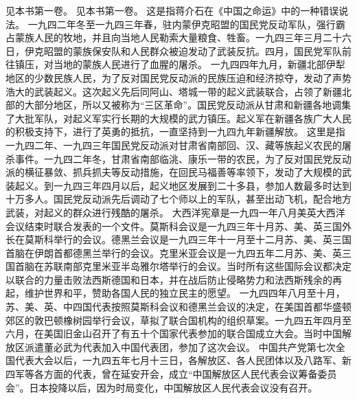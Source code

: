 \begin{maonote}
见本书第一卷。
见本书第一卷。
这是指蒋介石在《中国之命运》中的一种错误说法。
一九四二年冬至一九四三年春，驻内蒙伊克昭盟的国民党反动军队，强行霸占蒙族人民的牧地，并且向当地人民勒索大量粮食、牲畜。一九四三年三月二十六日，伊克昭盟的蒙族保安队和人民群众被迫发动了武装反抗。四月，国民党军队前往镇压，对当地的蒙族人民进行了血腥的屠杀。
一九四四年九月，新疆北部伊犁地区的少数民族人民，为了反对国民党反动派的民族压迫和经济掠夺，发动了声势浩大的武装起义。这次起义先后同阿山、塔城一带的起义武装联合，占领了新疆北部的大部分地区，所以又被称为“三区革命”。国民党反动派从甘肃和新疆各地调集了大批军队，对起义军实行长期的大规模的武力镇压。起义军在新疆各族广大人民的积极支持下，进行了英勇的抵抗，一直坚持到一九四九年新疆解放。
这里是指一九四二年、一九四三年国民党反动派对甘肃省南部回、汉、藏等族起义农民的屠杀事件。一九四二年冬，甘肃省南部临洮、康乐一带的农民，为了反对国民党反动派的横征暴敛、抓兵抓夫等反动措施，在回民马福善等率领下，发动了大规模的武装起义。到一九四三年四月以后，起义地区发展到二十多县，参加人数最多时达到十万多人。国民党反动派先后调动了七个师以上的军队，甚至出动飞机，配合地方武装，对起义的群众进行残酷的屠杀。
大西洋宪章是一九四一年八月美英大西洋会议结束时联合发表的一个文件。莫斯科会议是一九四三年十月苏、美、英三国外长在莫斯科举行的会议。德黑兰会议是一九四三年十一月至十二月苏、美、英三国首脑在伊朗首都德黑兰举行的会议。克里米亚会议是一九四五年二月苏、美、英三国首脑在苏联南部克里米亚半岛雅尔塔举行的会议。当时所有这些国际会议都决定以联合的力量击败法西斯德国和日本，并在战后防止侵略势力和法西斯残余的再起，维护世界和平，赞助各国人民的独立民主的愿望。
一九四四年八月至十月，苏、美、英、中四国代表按照莫斯科会议和德黑兰会议的决定，在美国首都华盛顿郊区的敦巴顿橡树园举行会议，草拟了联合国机构的组织草案。一九四五年四月至六月，在美国旧金山召开了有五十个国家代表参加的联合国成立大会。当时中国解放区派遣董必武为代表加入中国代表团，参加了这次会议。
中国共产党第七次全国代表大会以后，一九四五年七月十三日，各解放区、各人民团体以及八路军、新四军等各方面的代表，曾在延安开会，成立“中国解放区人民代表会议筹备委员会”。日本投降以后，因为时局变化，中国解放区人民代表会议没有召开。
\end{maonote}

